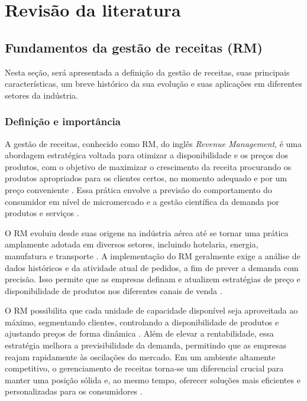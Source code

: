 \chapter{Revisão da literatura}


\section{Fundamentos da gestão de receitas (RM)}
Nesta seção, será apresentada a definição  da gestão de receitas, suas principais características, um breve histórico da sua evolução e suas aplicações em diferentes setores da indústria.

\subsection{Definição e importância}
A gestão de receitas, conhecido como RM, do inglês \textit{Revenue Management}, é uma abordagem estratégica voltada para otimizar a disponibilidade e os preços dos produtos, com o objetivo de maximizar o crescimento da receita  procurando os produtos apropriados para os clientes certos, no momento adequado e por um preço conveniente \citep{Robert1997}. Essa prática envolve a previsão do comportamento do consumidor em nível de micromercado e a gestão científica da demanda por produtos e serviços \citep{4736064}.

O RM evoluiu desde suas origens na indústria aérea até se tornar uma prática amplamente adotada em diversos setores, incluindo hotelaria, energia, manufatura e transporte \citep{Cross1995ANIT, Cheraghi2010RevenueMI}. A implementação do RM geralmente exige a análise de dados históricos e da atividade atual de pedidos, a fim de prever a demanda com precisão. Isso permite que as empresas definam e atualizem estratégias de preço e disponibilidade de produtos nos diferentes canais de venda \citep{Cheraghi2010RevenueMI}.

O RM possibilita que cada unidade de capacidade disponível seja aproveitada ao máximo, segmentando clientes, controlando a disponibilidade de produtos e ajustando preços de forma dinâmica \citep{HEO2009446}. Além de elevar a rentabilidade, essa estratégia melhora a previsibilidade da demanda, permitindo que as empresas reajam rapidamente às oscilações do mercado. Em um ambiente altamente competitivo, o gerenciamento de receitas torna-se um diferencial crucial para manter uma posição sólida e, ao mesmo tempo, oferecer soluções mais eficientes e personalizadas para os consumidores \citep{Gallego1994}.

